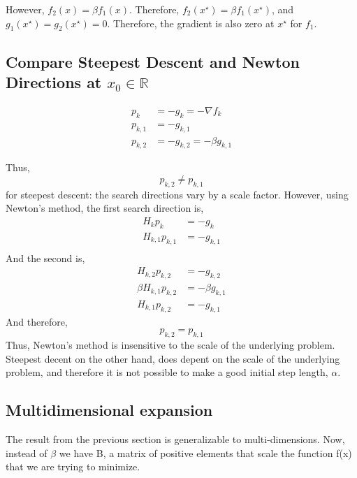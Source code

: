 \documentclass{article}
\begin{document}
However, $f_2(x) = \beta f_1(x)$. Therefore,  $f_2(x^\star) = \beta
f_1(x^\star)$, and $g_1(x^\star) = g_2(x^\star) = 0 $. Therefore, the
gradient is also zero at $x^\star$ for $f_1$.

\subsection{Compare Steepest Descent and Newton Directions at $x_0 \in \mathbb{R}$}

\begin{align*}
 p_k&=-g_k = -\nabla f_k\\
 p_{k,1}&=-g_{k,1}\\
 p_{k,2}&=-g_{k,2} = -\beta g_{k,1}
\end{align*}

Thus, 
\begin{equation}
p_{k,2} \ne p_{k,1}
\end{equation}
for steepest descent: the search directions
vary by a scale factor. However, using Newton's method, the first search
direction is,
\begin{align*}
 H_k p_k&=-g_k \\
 H_{k,1} p_{k,1}&=-g_{k,1}\\
\end{align*}
And the second is,
\begin{align*}
 H_{k,2} p_{k,2}&=-g_{k,2}\\
 \beta H_{k,1} p_{k,2}&=- \beta g_{k,1}\\
 H_{k,1} p_{k,2}&=-g_{k,1}
\end{align*}
And therefore, 
\begin{equation}
p_{k,2} = p_{k,1}
\end{equation}
Thus, Newton's method is insensitive to the scale of the underlying
problem. Steepest decent on the other hand, does depent on the scale of
the underlying problem, and therefore it is not possible to make a good
initial step length, $\alpha$.

\subsection{Multidimensional expansion}

The result from the previous section is generalizable to
multi-dimensions. Now, instead of $\beta$ we have B, a matrix of
positive elements that scale the function f(x) that we are trying to
minimize. 
\end{document}
